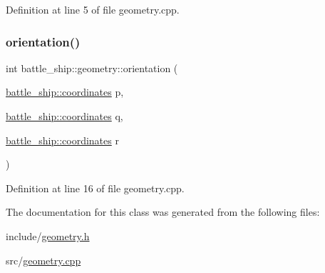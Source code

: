 Definition at line 5 of file geometry.\+cpp.

\mbox{\label{classbattle__ship_1_1geometry_a319941076b65116cfb1ab1f636fb9b20}} 
\subsubsection{\texorpdfstring{orientation()}{orientation()}}
{\footnotesize\ttfamily int battle\+\_\+ship\+::geometry\+::orientation (\begin{DoxyParamCaption}\item[{\hyperlink{structbattle__ship_1_1coordinates}{battle\+\_\+ship\+::coordinates}}]{p,  }\item[{\hyperlink{structbattle__ship_1_1coordinates}{battle\+\_\+ship\+::coordinates}}]{q,  }\item[{\hyperlink{structbattle__ship_1_1coordinates}{battle\+\_\+ship\+::coordinates}}]{r }\end{DoxyParamCaption})\hspace{0.3cm}{\ttfamily [static]}}



Definition at line 16 of file geometry.\+cpp.



The documentation for this class was generated from the following files\+:\begin{DoxyCompactItemize}
\item 
include/\hyperlink{geometry_8h}{geometry.\+h}\item 
src/\hyperlink{geometry_8cpp}{geometry.\+cpp}\end{DoxyCompactItemize}
